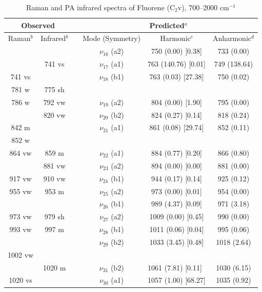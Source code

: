	\begin{table}[H]
		\caption{Raman and PA infrared spectra of Fluorene (C$_{2}$v), 700–2000 cm$^{-1}$}
		\begin{center}
				\begin{tabular}{c c c c c c}
					\hline
					\multicolumn{ 2}{c}{Observed} & \multicolumn{1}{c}{} & \multicolumn{ 3}{c}{Predicted$^{a}$} \\ \hline
					Raman$^{b}$ & \multicolumn{1}{c}{Infrared$^{b}$} &  & \multicolumn{1}{c}{Mode (Symmetry)} & \multicolumn{1}{c}{Harmonic$^{c}$} & Anharmonic$^{d}$ \\ \hline
 &  &  & $\nu_{16}$ (a2) & 750 (0.00) [0.38] & 733 (0.00) \\ 
 & 741 vs &  & $\nu_{17}$ (a1) & 763 (140.76) [0.01] & 749 (138.64) \\ 
 741 vs &  &  & $\nu_{18}$ (b1) & 763 (0.03) [27.38] & 750 (0.02) \\ 
 781 w & 775 sh &  & \multicolumn{1}{l}{        
 } &  &  \\ 
 786 w & 792 vw &  & $\nu_{19}$ (a2) & 804 (0.00) [1.90] & 795 (0.00) \\ 
 & 820 vw &  & $\nu_{20}$ (b2) & 824 (0.27) [0.14] & 818 (0.24) \\ 
 842 m &  &  & $\nu_{21}$ (a1) & 861 (0.08) [29.74] & 852 (0.11) \\ 
 852 w &  &  &  &  &  \\ 
 864 vw & 859 m &  & $\nu_{22}$ (a1) & 884 (0.77) [0.20] & 866 (0.80) \\ 
 & 881 vw &  & $\nu_{23}$ (a2) & 894 (0.00) [0.00] & 881 (0.00) \\ 
 917 vw & 910 vw &  & $\nu_{24}$ (b1) & 944 (0.17) [0.14] & 925 (0.12) \\ 
 955 vw & 953 m &  & $\nu_{25}$ (a2) & 973 (0.00) [0.01] & 954 (0.00) \\ 
 &  &  & $\nu_{26}$ (b1) & 989 (4.37) [0.09] & 971 (3.18) \\ 
 973 vw & 979 sh &  & $\nu_{27}$ (a2) & 1009 (0.00) [0.45] & 990 (0.00) \\ 
 993 vw & 997 m &  & \multicolumn{1}{c}{ $\nu_{28}$ (b1)} & 1011 (0.06) [0.04] & 995 (0.06) \\ 
 &  &  & $\nu_{29}$ (b2)
 & 1033 (3.45) [0.48] & 1018 (2.64) \\ 
 1002 vw &  &  &  &  &  \\ 
 & 1020 m &  & $\nu_{31}$ (b2) & \multicolumn{1}{l}{    1061 (7.81) [0.11]} & 1030 (6.15) \\ 
 1020 vs &  &  & $\nu_{30}$ (a1) & 1057 (1.00) [68.27] & 1035 (0.92) \\ 

\end{tabular}
\end{center}
\end{table}

